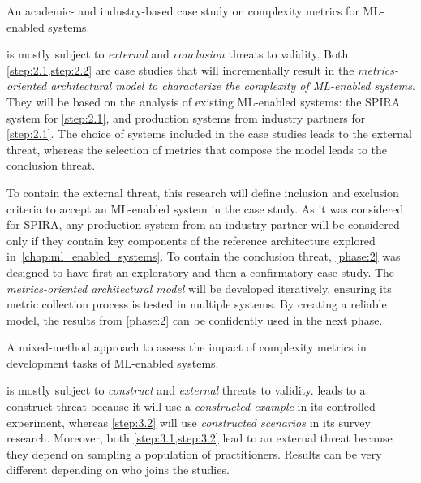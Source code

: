   \begin{expectedresult}
    An academic- and industry-based case study on complexity metrics for
    ML-enabled systems.
  \end{expectedresult}

   is mostly subject to \emph{external} and \emph{conclusion}
  threats to validity. Both \cref{step:2.1,step:2.2} are case studies that
  will incrementally result in the \emph{metrics-oriented architectural model
  to characterize the complexity of ML-enabled systems}. They will be based
  on the analysis of existing ML-enabled systems: the SPIRA system for
  \cref{step:2.1}, and production systems from industry partners for
  \cref{step:2.1}. The choice of systems included in the case studies
  leads to the external threat, whereas the selection of metrics that
  compose the model leads to the conclusion threat.

  To contain the external threat, this research will define inclusion and
  exclusion criteria to accept an ML-enabled system in the case study.
  As it was considered for SPIRA, any production system from an industry
  partner will be considered only if they contain key components of the
  reference architecture explored in~\cref{chap:ml_enabled_systems}.
  To contain the conclusion threat, \cref{phase:2} was designed to have
  first an exploratory and then a confirmatory case study.
  The \emph{metrics-oriented architectural model} will be developed
  iteratively, ensuring its metric collection process is tested in
  multiple systems. By creating a reliable model, the results from
  \cref{phase:2} can be confidently used in the next phase.

  \begin{expectedresult}
    A mixed-method approach to assess the impact of complexity metrics
    in development tasks of ML-enabled systems.
  \end{expectedresult}
  
   is mostly subject to \emph{construct} and \emph{external}
  threats to validity.  leads to a construct threat because
  it will use a \emph{constructed example} in its controlled experiment,
  whereas \cref{step:3.2} will use \emph{constructed scenarios} in its
  survey research. Moreover, both \cref{step:3.1,step:3.2} lead
  to an external threat because they depend on sampling a population of
  practitioners. Results can be very different depending on who joins
  the studies.

